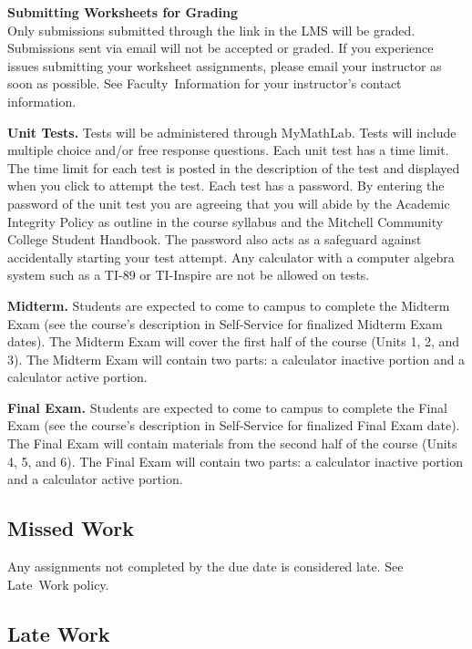 \documentclass{article}
\renewenvironment{framed}[1][]{%
  \def\FrameCommand{%
    \hspace{1pt}%
    {\color{mybordercolor}\vrule width 2pt} %
    \hspace{1pt}%
    \fboxsep=\FrameSep%
    \colorbox{mybgcolor}%
  }%
  \MakeFramed {\advance\hsize-\width \FrameRestore}%
}{%
  \endMakeFramed
}
\begin{document}
\begin{framed}
\textbf{Submitting Worksheets for Grading}\\
Only submissions submitted through the link in the LMS will be graded. Submissions sent via email will not be accepted or graded. If you experience issues submitting your worksheet assignments, please email your instructor as soon as possible. See Faculty~Information for your instructor's contact information.
\end{framed}

\textbf{Unit Tests.} Tests will be administered through MyMathLab. Tests will include multiple choice and/or free response questions. Each unit test has a time limit. The time limit for each test is posted in the description of the test and displayed when you click to attempt the test. Each test has a password. By entering the password of the unit test you are agreeing that you will abide by the Academic Integrity Policy as outline in the course syllabus and the Mitchell Community College Student Handbook. The password also acts as a safeguard against accidentally starting your test attempt. Any calculator with a computer algebra system such as a TI-89 or TI-Inspire are not be allowed on tests.

\textbf{Midterm.} Students are expected to come to campus to complete the Midterm Exam (see the course's description in Self-Service for finalized Midterm Exam dates). The Midterm Exam will cover the first half of the course (Units 1, 2, and 3). The Midterm Exam will contain two parts: a calculator inactive portion and a calculator active portion.

\textbf{Final Exam.} Students are expected to come to campus to complete the Final Exam (see the course's description in Self-Service for finalized Final Exam date). The Final Exam will contain materials from the second half of the course (Units 4, 5, and 6). The Final Exam will contain two parts: a calculator inactive portion and a calculator active portion.

\subsection{Missed Work}

Any assignments not completed by the due date is considered late. See Late~Work policy.

\subsection{Late Work}
\end{document}
